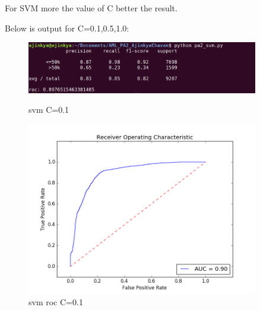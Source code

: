\documentclass{article}
\begin{document}
For SVM more the value of C better the result. 

Below is output for C=0.1,0.5,1.0:   

\begin{figure}
    \centering
    \begin{minipage}{0.45\textwidth}
        \centering
        \includegraphics[width=0.9\textwidth]{svm_01.png} %
        \caption{svm C=0.1}
    \end{minipage}\hfill
    \begin{minipage}{0.45\textwidth}
        \centering
        \includegraphics[width=0.9\textwidth]{roc_svm_01.png} %
        \caption{svm roc C=0.1}
    \end{minipage}
\end{figure}
\end{document}
